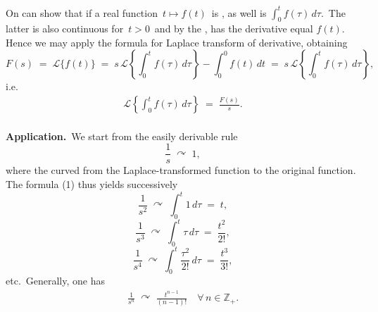 \documentclass[12pt]{article}
\theoremstyle{definition}
\begin{document}
On can show that if a real function \,$t \mapsto f(t)$\, is 
, as well 
is $\displaystyle\int_0^tf(\tau)\,d\tau$.\, The latter is also 
continuous for\, $t > 0$\, and by the 
, 
has the derivative equal $f(t)$.\, Hence we may apply the 
formula for Laplace transform of derivative, obtaining
$$F(s) \;=\; \mathcal{L}\{f(t)\} \;=\; s\,\mathcal{L} \left\{\int_0^t\!f(\tau)\,d\tau\right\}-\int_0^0\!f(t)\,dt 
\;=\; s\,\mathcal{L} \left\{\int_0^t\!f(\tau)\,d\tau\right\},$$
i.e.
\begin{align}
\mathcal{L} \left\{\int_0^t\!f(\tau)\,d\tau\right\} \;=\; \frac{F(s)}{s}.
\end{align}\\

\textbf{Application.}\, We start from the easily derivable rule
$$\frac{1}{s} \;\curvearrowright\; 1,$$
where the curved  from the Laplace-transformed function to the original function.\, The formula (1) thus yields successively
$$\frac{1}{s^2} \;\curvearrowright\; \int_0^t\!1\,d\tau \;=\; t,$$
$$\frac{1}{s^3} \;\curvearrowright\; \int_0^t\!\tau\,d\tau \;=\; \frac{t^2}{2!},$$
$$\frac{1}{s^4} \;\curvearrowright\; \int_0^t\!\frac{\tau^2}{2!}\,d\tau \;=\; \frac{t^3}{3!},$$
etc.\, Generally, one has
\begin{align}
\frac{1}{s^n} \;\curvearrowright\; \frac{t^{n-1}}{(n\!-\!1)!} \quad \forall\, n \in \mathbb{Z}_+.
\end{align}
\end{document}
